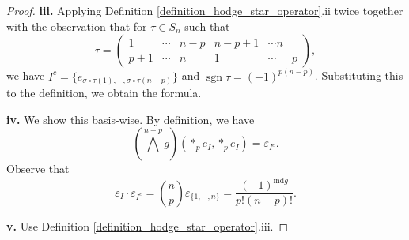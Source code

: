 \documentclass[8pt]{article}
\DeclareMathOperator{\ind}{ind}
\DeclareMathOperator{\sgn}{sgn}
\DeclareMathOperator{\vol}{vol}
\begin{document}
\begin{proof}
\par\textbf{iii.}
Applying Definition \ref{definition_hodge_star_operator}.ii twice together with the observation that for $\tau\in S_n$ such that
\begin{equation*}
  \tau = \begin{pmatrix}
    1 & \cdots & n-p & n-p+1 & \cdots n \\ 
    p+1 & \cdots & n & 1 & \cdots & p
  \end{pmatrix},
\end{equation*}
we have $I^c = \{e_{\sigma\circ\tau(1),\cdots,\sigma\circ\tau(n-p)}\}$ and $\sgn\tau = (-1)^{p(n-p)}$. Substituting this to the definition, we obtain the formula.
\par\textbf{iv.} We show this basis-wise. By definition, we have
\begin{equation*}
  \left(\bigwedge^{n-p}g\right)(\ast_pe_I,\ast_pe_I) = \varepsilon_{I^c}.
\end{equation*}
Observe that 
\begin{equation*}
  \varepsilon_{I}\cdot \varepsilon_{I^c} = {n \choose p}\varepsilon_{\{1,\cdots,n\}} = {\frac {(-1)^{\mathrm{ind}g}} {p!(n-p)!}}.
\end{equation*}
\par\textbf{v.} Use Definition \ref{definition_hodge_star_operator}.iii.
\end{proof}
\end{document}
